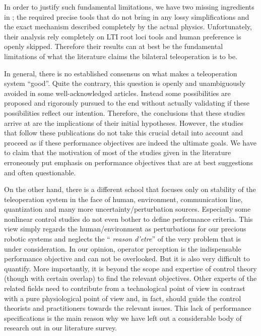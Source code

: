 In order to justify such fundamental limitations, we have two missing ingredients in \cite{danielmcaree}; the required precise tools that
do not bring in any lossy simplifications and the exact mechanism described completely by the actual physics. Unfortunately, their analysis 
rely completely on LTI root loci tools and human preference is openly skipped. Therefore their results can at best be the fundamental 
limitations of what the literature claims the bilateral teleoperation is to be.

In general, there is no established consensus on what makes a teleoperation system \enquote{good}. Quite the contrary, 
this question is openly and unambiguously avoided in some well-acknowledged articles. Instead some possibilities are 
proposed and rigorously pursued to the end without actually validating if these possibilities reflect our intention. 
Therefore, the conclusions that these studies arrive at are the implications of their initial hypotheses. However, 
the studies that follow these publications do not take this crucial detail into account and proceed as if these 
performance objectives are indeed the ultimate goals. We have to claim that the motivation of most of the studies 
given in the literature erroneously put emphasis on performance objectives that are at best suggestions and often 
questionable. 

On the other hand, there is a different school that focuses only on stability of the teleoperation system in the 
face of human, environment, communication line, quantization and many more uncertainty/perturbation sources. 
Especially some nonlinear control studies do not even bother to define performance criteria. This view simply 
regards the human/environment as perturbations for our precious robotic systems and neglects the \enquote{\emph{%
reason d'etre}} of the very problem that is under consideration. In our opinion, operator perception is the 
indispensable performance objective and can not be overlooked. But it is also very difficult to quantify. More 
importantly, it is beyond the scope and expertise of control theory (though with certain overlap) to find the relevant 
objectives. Other experts of the related fields need to contribute from a technological point of view in 
contrast with a pure physiological point of view and, in fact,  should guide the control theorists and practitioners 
towards the relevant issues. This lack of performance specifications is the main reason why we have left out a considerable 
body of research out in our literature survey.


